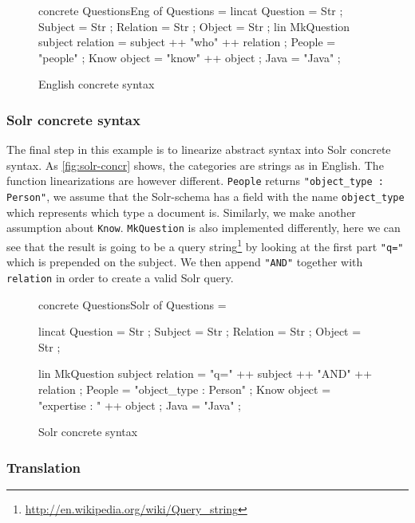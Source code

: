 \newenvironment{myfont}{\myfont}{\par}

\begin{figure}[h]
\begin{code}
concrete QuestionsEng of Questions = {
  lincat
    Question = Str ;
    Subject = Str ;
    Relation = Str ;
    Object = Str ;
  lin
    MkQuestion subject relation = subject ++ "who" ++ relation ;
    People = "people" ;
    Know object = "know" ++ object ;
    Java = "Java" ;
}
\end{code}
\caption{English concrete syntax\label{fig:english-concr}}
\end{figure}

\subsubsection*{Solr concrete syntax}

The final step in this example is to linearize abstract syntax into Solr concrete syntax.
  As \autoref{fig:solr-concr} shows, the categories are strings as in English. The function linearizations are however
  different. \texttt{People} returns 
  \texttt{"object\_type : Person"}, we assume that 
  the Solr-schema has a field with the name \texttt{object\_type} which represents 
  which type a document is. Similarly, we make another assumption about \texttt{Know}. \texttt{MkQuestion} is also implemented differently, here we can see that the result is going to be a query string\footnote{\url{http://en.wikipedia.org/wiki/Query\_string}} by looking at the first part \texttt{"q="} which is prepended on the subject. We then append \texttt{"AND"} together with \texttt{relation} in order to create a valid Solr query.

\begin{figure}[h]
\begin{code}
concrete QuestionsSolr of Questions = {
    lincat
      Question = Str ;
      Subject = Str ;
      Relation = Str ;
      Object = Str ;

    lin
      MkQuestion subject relation = "q=" ++ subject ++ "AND" ++ relation ;
      People = "object_type : Person" ;
      Know object = "expertise : " ++ object ;
      Java = "Java" ;
}
\end{code}
\caption{Solr concrete syntax\label{fig:solr-concr}}
\end{figure}

\pagebreak

\subsubsection*{Translation}

